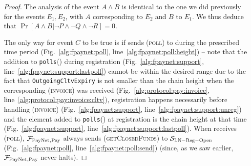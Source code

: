 \begin{proof}
  The analysis of the event $A \wedge B$ is identical to the one we did
  previously for the events $E_1, E_2$, with $A$ corresponding to $E_2$ and $B$
  to $E_1$. We thus deduce that $\Pr[A \wedge B | \neg P \wedge \neg Q \wedge
  \neg R] = 0$.

  The only way for event $C$ to be true is if \environment{} sends
  (\textsc{poll}) to \dave{} during the prescribed time period
  (Fig.~\ref{alg:fpaynet:poll}, line~\ref{alg:fpaynet:poll:height}) -- note that
  the addition to \texttt{polls}(\dave) during registration
  (Fig.~\ref{alg:fpaynet:support}, line~\ref{alg:fpaynet:support:lastpoll})
  cannot be within the desired range due to the fact that
  \texttt{OutgoingCltvExpiry} is not smaller than the chain height when the
  corresponding (\textsc{invoice}) was received
  (Fig.~\ref{alg:protocol:pay:invoice},
  line~\ref{alg:protocol:pay:invoice:cltv}), registration happens necessarily
  before handling (\textsc{invoice}) (Fig.~\ref{alg:fpaynet:support},
  line~\ref{alg:fpaynet:support:unreg}) and the element added to
  \texttt{polls}(\dave) at registration is the chain height at that time
  (Fig.~\ref{alg:fpaynet:support}, line~\ref{alg:fpaynet:support:lastpoll}).
  When \dave{} receives (\textsc{poll}), $\mathcal{F}_{\mathrm{PayNet}}{}_{\mathrm{, Pay}}$ always
  sends (\textsc{getClosedFunds}) to $\mathcal{S}_{\mathrm{LN - Reg - Open}}$
  (Fig.~\ref{alg:fpaynet:poll}, line~\ref{alg:fpaynet:poll:send}) (since, as we
  saw earlier, $\mathcal{F}_{\mathrm{PayNet}}{}_{\mathrm{, Pay}}$ never halts).


\end{proof}
